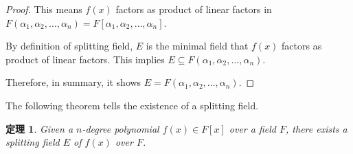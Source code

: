 \documentclass[utf8]{ctexbook}
\newtheorem{theorem}{定理}[section]
\begin{document}
\begin{proof}
This means $f(x)$ factors as product of linear factors in $F (\alpha_1, \alpha_2, \ldots, \alpha_n) = F[\alpha_1, \alpha_2, \ldots, \alpha_n]$.

By definition of splitting field, $E$ is the minimal field that $f(x)$ factors as product of linear factors. This implies $E \subseteq F (\alpha_1, \alpha_2, \ldots, \alpha_n) $.

Therefore, in summary, it shows $E = F (\alpha_1, \alpha_2, \ldots, \alpha_n) $.

\end{proof}

The following theorem tells the existence of a splitting field.

\begin{theorem}
\label{theorem_4_4_2_existence_splitting_field}
Given a $n$-degree polynomial $f(x) \in F[x]$ over a field $F$, there exists a splitting field $E$ of $f(x)$ over $F$.
\end{theorem}
\end{document}
